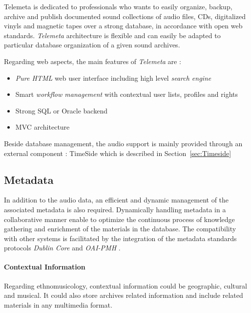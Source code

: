 \documentclass[runningheads,a4paper]{llncs}
\begin{document}
Telemeta is dedicated to professionals who wants to easily organize, backup, archive and publish documented sound collections of audio files, CDs, digitalized vinyls and magnetic tapes over a strong database, in accordance with open web standards. 
\emph{Telemeta} architecture is flexible and can easily be adapted to particular database organization of a given sound archives. 

Regarding web aspects, the main features of \emph{Telemeta} are :
\begin{itemize}
\item \emph{Pure HTML} web user interface including high level \emph{search engine}
\item Smart \emph{workflow management} with contextual user lists, profiles and rights
\item Strong SQL or Oracle backend
\item MVC architecture 
\end{itemize}
Beside database management, the audio support is mainly provided through an external component : TimeSide which is described in Section~\ref{sec:Timeside}

\subsection{Metadata}\label{sec:metadata}
In addition to the audio data, an efficient and dynamic management of the associated metadata is also required. %
Dynamically handling metadata in a collaborative manner enable to optimize the continuous process of knowledge gathering and enrichment of the materials in the database.  
The compatibility with other systems is facilitated by the integration of the metadata standards protocols \emph{Dublin Core} and \emph{OAI-PMH} \cite{DublinCore,OAI-PMH}.

\paragraph{Contextual Information}
Regarding ethnomusicology, contextual information could be geographic, cultural and musical. It could also store archives related information and include related materials in any multimedia format.  
\end{document}
